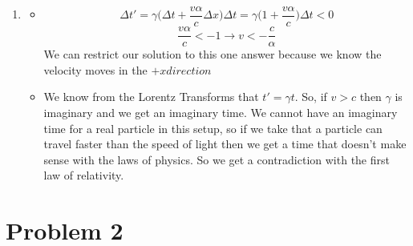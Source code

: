 \documentclass[11pt]{article}
\begin{document}
\begin{enumerate}[label=\alph*)]
\begin{itemize}
        
    \end{itemize}
    \item
    \begin{itemize}
        \item 
        \[\Delta t' = \gamma \Big(\Delta t + \frac{v \alpha}{c}\Delta x \Big)\Delta t = \gamma \Big(1+ \frac{v \alpha}{c}\Big) \Delta t<0\]
        \[\frac{v \alpha}{c} < -1 \rightarrow v<-\frac{c}{\alpha}\]
        We can restrict our solution to this one answer because we know the velocity moves in the $+x direction$
        \item
        We know from the Lorentz Transforms that $t'=\gamma t$. So, if $v>c$ then $\gamma$ is imaginary and we get an imaginary time. We cannot have an imaginary time for a real particle in this setup, so if we take that a particle can travel faster than the speed of light then we get a time that doesn't make sense with the laws of physics. So we get a contradiction with the first law of relativity.
    \end{itemize}
    
    \end{enumerate}

\section*{Problem 2}
\end{document}
